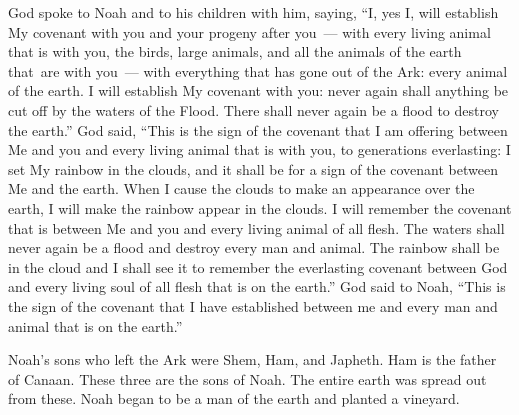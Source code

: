 \begin{inparaenum}
     God spoke to Noah and to his children with him, saying,%
     ``I, yes I, will establish My covenant with you and your progeny after you~---%
     with every living animal that is with you, the birds, large animals, and all the animals of the earth that\understood\ are with you~--- with everything that has gone out of the Ark: every animal of the earth.%
     I will establish My covenant with you: never again shall anything be cut off by the waters of the Flood. There shall never again be a flood to destroy the earth.''%
     God said, ``This is the sign of the covenant that I am offering between Me and you and every living animal that is with you, to generations everlasting:%
     I set My rainbow in the clouds, and it shall be for a sign of the covenant between Me and the earth.%
     When I cause the clouds to make an appearance over the earth, I will make the rainbow appear in the clouds.%
     I will remember the covenant that is between Me and you and every living animal of all flesh. The waters shall never again be a flood and destroy every man and animal.%
     The rainbow shall be in the cloud and I shall see it to remember the everlasting covenant between God and every living soul of all flesh that is on the earth.''%
     God said to Noah, ``This is the sign of the covenant that I have established between me and every man and animal that is on the earth.''%
    
     Noah's sons who left the Ark were Shem, Ham, and Japheth. Ham is the father of Canaan.%
     These three are the sons of Noah. The entire earth was spread out from these.%
     Noah began to be a man of the earth and planted a vineyard.%
    
    
\end{inparaenum}
